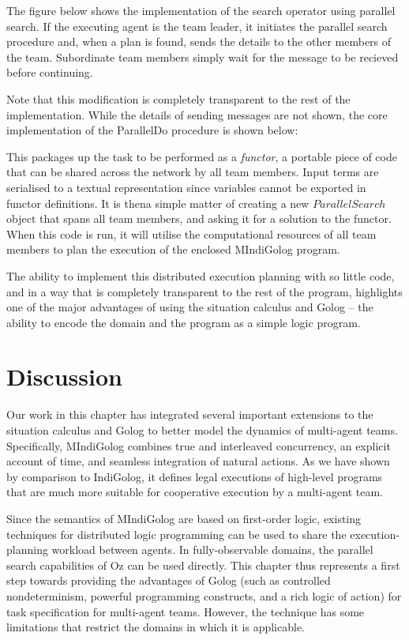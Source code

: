 The figure below shows the implementation of the search operator using
parallel search. If the executing agent is the team leader, it initiates
the parallel search procedure and, when a plan is found, sends the
details to the other members of the team. Subordinate team members
simply wait for the message to be recieved before continuing.


Note that this modification is completely transparent to the rest
of the implementation. While the details of sending messages are not
shown, the core implementation of the ParallelDo procedure is shown
below:


This packages up the task to be performed as a \emph{functor}, a portable
piece of code that can be shared across the network by all team members.
Input terms are serialised to a textual representation since variables
cannot be exported in functor definitions. It is thena simple matter
of creating a new $ParallelSearch$ object that spans all team members,
and asking it for a solution to the functor. When this code is run,
it will utilise the computational resources of all team members to
plan the execution of the enclosed MIndiGolog program. 

The ability to implement this distributed execution planning with
so little code, and in a way that is completely transparent to the
rest of the program, highlights one of the major advantages of using
the situation calculus and Golog -- the ability to encode the domain
and the program as a simple logic program.


\section{Discussion\label{sec:MIndiGolog:Discussion}}

Our work in this chapter has integrated several important extensions
to the situation calculus and Golog to better model the dynamics of
multi-agent teams. Specifically, MIndiGolog combines true and interleaved
concurrency, an explicit account of time, and seamless integration
of natural actions. As we have shown by comparison to IndiGolog, it
defines legal executions of high-level programs that are much more
suitable for cooperative execution by a multi-agent team.

Since the semantics of MIndiGolog are based on first-order logic,
existing techniques for distributed logic programming can be used
to share the execution-planning workload between agents. In fully-observable
domains, the parallel search capabilities of Oz can be used directly.
This chapter thus represents a first step towards providing the advantages
of Golog (such as controlled nondeterminism, powerful programming
constructs, and a rich logic of action) for task specification for
multi-agent teams. However, the technique has some limitations that
restrict the domains in which it is applicable.


